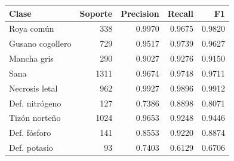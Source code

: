 \begin{tabular}{lrrrr}
\toprule
\textbf{Clase} & \textbf{Soporte} & \textbf{Precision} & \textbf{Recall} & \textbf{F1} \\
\midrule
Roya común & 338 & 0.9970 & 0.9675 & 0.9820 \\
Gusano cogollero & 729 & 0.9517 & 0.9739 & 0.9627 \\
Mancha gris & 290 & 0.9027 & 0.9276 & 0.9150 \\
Sana & 1311 & 0.9674 & 0.9748 & 0.9711 \\
Necrosis letal & 962 & 0.9927 & 0.9896 & 0.9912 \\
Def. nitrógeno & 127 & 0.7386 & 0.8898 & 0.8071 \\
Tizón norteño & 1024 & 0.9653 & 0.9248 & 0.9446 \\
Def. fósforo & 141 & 0.8553 & 0.9220 & 0.8874 \\
Def. potasio & 93 & 0.7403 & 0.6129 & 0.6706 \\
\bottomrule
\end{tabular}
